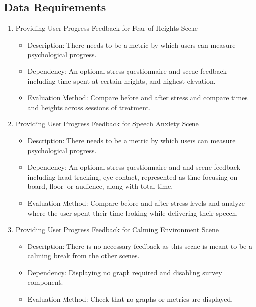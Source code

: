 \documentclass[a4paper,10pt]{article}
\begin{document}
	\subsection{Data Requirements}%
	\begin{enumerate}
	\item Providing User Progress Feedback for Fear of Heights Scene
	\begin{itemize}
	  \item Description: There needs to be a metric by which users can measure psychological progress.
	  \item Dependency: An optional stress questionnaire and scene feedback including time spent at certain heights, and highest elevation.
	  \item Evaluation Method: Compare before and after stress and compare times and heights across sessions of treatment.
	\end{itemize}
	\item Providing User Progress Feedback for Speech Anxiety Scene
	\begin{itemize}
		\item Description: There needs to be a metric by which users can measure psychological progress.
	  \item Dependency: An optional stress questionnaire and and scene feedback including  head tracking, eye contact, represented as time focusing on board, floor, or audience, along with total time.
		\item Evaluation Method: Compare before and after stress levels and analyze where the user spent their time looking while delivering their speech.
	\end{itemize}
	\item Providing User Progress Feedback for Calming Environment Scene
	\begin{itemize}
		\item Description: There is no necessary feedback as this scene is meant to be a calming break from the other scenes.
		\item Dependency: Displaying no graph required and disabling survey component.
		\item Evaluation Method: Check that no graphs or metrics are displayed. 
	\end{itemize}	
	\end{enumerate}
	
\end{document}

